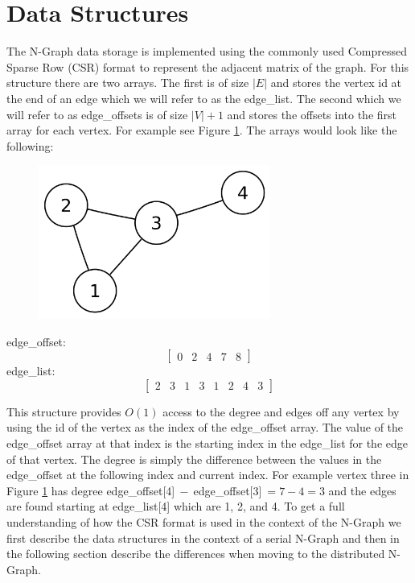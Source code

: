 \documentclass[12pt]{article}
\begin{document}
\section{Data Structures}
The N-Graph data storage is implemented using the commonly used Compressed Sparse
Row (CSR) format to represent the adjacent matrix of the graph. For this structure
there are two arrays. The first is of size $|E|$ and stores the vertex id
at the end of an edge which we will refer to as the edge\_list. The second
which we will refer to as edge\_offsets is of size $|V|+1$ and stores the
offsets into the first array for each vertex. For example see Figure
\ref{fig:simple_graph}. The arrays would look like the following: \\

\begin{figure}[!h]
  \includegraphics[width=3in]{graph.png}
  \caption{\label{fig:simple_graph}
  }
\end{figure}

\noindent edge\_offset:
\[ \left[ \begin{matrix} 0 & 2 & 4 & 7 & 8\end{matrix} \right] \]
edge\_list:
\[ \left[ \begin{matrix} 2 & 3 & 1 & 3 & 1 & 2 & 4 & 3 \end{matrix} \right] \]

\noindent This structure provides $O(1)$ access to the degree and edges off any
vertex by using the id of the vertex as the index of the edge\_offset array.
The value of the edge\_offset array at that index is the starting index in
the edge\_list for the edge of that vertex. The degree is simply the
difference between the values in the edge\_offset at the following index and
current index. For example vertex three in Figure \ref{fig:simple_graph} has
degree edge\_offset[4]$\ -\ $edge\_offset[3]$\ = 7 - 4 = 3$ and the edges are
found starting at edge\_list[4] which are 1, 2, and 4. To get a full
understanding of how the CSR format is used in the context of the N-Graph
we first describe the data structures in the context of a serial N-Graph
and then in the following section describe the differences when moving to
the distributed N-Graph.
\end{document}
